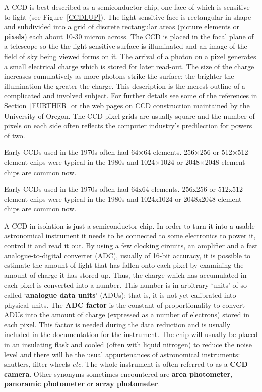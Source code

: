 \documentclass[twoside,11pt]{article}
\newcommand{\htmladdnormallink}[2]{#1}
\begin{document}
A CCD is best described as a semiconductor chip, one face of which is
sensitive to light (see Figure~\ref{CCDLUP}).  The light sensitive face is
rectangular in shape and subdivided into a grid of discrete rectangular
areas (picture elements or {\bf pixels}) each about 10-30 micron across.
The CCD is placed in the focal plane of a telescope so the the
light-sensitive surface is illuminated and an image of the field of sky
being viewed forms on it.  The arrival of a photon on a pixel generates a
small electrical charge which is stored for later read-out.  The size of
the charge increases cumulatively as more photons strike the surface: the
brighter the illumination the greater the charge. 
This description is the merest outline of a complicated and involved
subject.  For further details see some of the references in
Section~\ref{FURTHER} or the \htmladdnormallink{web pages on CCD construction}
{http://zebu.uoregon.edu/ccd.html} maintained by the University of Oregon.
The CCD pixel grids are usually square and the number of pixels on each
side often reflects the computer industry's predilection for powers of two.
\begin{latex}
Early CCDs used in the 1970s often had 64$\times$64 elements. 256$\times$256
or 512$\times$512 element chips were typical in the 1980s and
1024$\times$1024 or 2048$\times$2048 element chips are common now.
\end{latex}
\begin{htmlonly}
Early CCDs used in the 1970s often had 64x64 elements. 256x256 or 512x512
element chips were typical in the 1980s and 1024x1024 or 2048x2048 element
chips are common now.
\end{htmlonly}

A CCD in isolation is just a semiconductor chip.  In order to turn it
into a usable astronomical instrument it needs to be connected to some
electronics to power it, control it and read it out.  By using a few
clocking circuits, an amplifier and a fast analogue-to-digital converter
(ADC), usually of 16-bit accuracy, it is possible to estimate the amount of
light that has fallen onto each pixel by examining the amount of charge it
has stored up.  Thus, the charge which has accumulated in each pixel is
converted into a number.  This number is in arbitrary `units' of so-called
`{\bf analogue data units}' (ADUs); that is, it is not yet calibrated into
physical units.  The {\bf ADC factor} is the constant of proportionality
to convert ADUs into the amount of charge (expressed as a number of
electrons) stored in each pixel.  This factor is needed during the data
reduction and is usually included in the documentation for the instrument.
The chip will usually be placed in an insulating flask and cooled (often
with liquid nitrogen) to reduce the noise level and there will be the usual
appurtenances of astronomical instruments: shutters, filter wheels
\emph{etc}.  The whole instrument is often referred to as a {\bf CCD camera}.
Other synonyms sometimes encountered are {\bf area photometer}, {\bf
panoramic photometer} or {\bf array photometer}.
\end{document}
